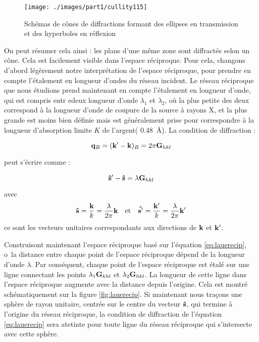 \begin{figure}
    \texttt{[image: ./images/part1/cullity115]}
    \caption{Schémas de cônes de diffractions formant des ellipses en transmission et des hyperboles en réflexion}
    \label{fig:laue}
\end{figure}

On peut résumer cela ainsi : les plans d'une même zone sont diffractés selon un cône. Cela est facilement visible dans l'espace réciproque. Pour cela, changons d'abord légèrement notre interprétation de l'espace réciproque, pour prendre en compte l'étalement en longueur d'ondes du réseau incident. Le réseau réciproque que nous étudions prend maintenant en compte l'étalement en longueur d'onde, qui est compris entr edeux longueur d'onde $\lambda_1$ et $\lambda_2$, où la plus petite des deux correspond à la longueur d'onde de coupure de la source à rayons X, et la plus grande est moins bien définie mais est généralement prise pour correspondre à la longueur d'absorption limite $K$ de l'argent( \SI{0.48}{\angstrom}).
La condition de diffraction :

\begin{equation}
    \mathbf{q}_B = (\mathbf{k'-k})_B = 2 \pi \mathbf{G}_{hkl}
\end{equation}

peut s'écrire comme :

\begin{equation}
    \label{eq:lauerecip}
    \mathbf{\hat{s}}' - \mathbf{\hat{s}} = \lambda \mathbf{G}_{hkl}
\end{equation}

avec
\begin{equation}
    \mathbf{\hat{s}} = \frac{\mathbf{k}}{k} = \frac{\lambda}{2\pi}\mathbf{k}\quad\text{et}\quad
    \mathbf{\hat{s'}} = \frac{\mathbf{k'}}{k} = \frac{\lambda}{2\pi}\mathbf{k'}
\end{equation}
ce sont les vecteurs unitaires correspondants aux directions de $\mathbf{k}$ et $\mathbf{k'}$.

Construisont maintenant l'espace réciproque basé sur l'équation \ref{eq:lauerecip}, o\ la distance entre chaque point de l'espace réciproque dépend de la longueur d'onde $\lambda$. Par conséquent, chaque point de l'espace réciproque est étalé sur une ligne connectant les points $\lambda_1\mathbf{G}_{khl}$ et $\lambda_2\mathbf{G}_{hkl}$. La longueur de cette ligne dans l'espace réciproque augmente avec la distance depuis l'origine. Cela est montré schématiquement sur la figure \ref{fig:lauerecip}. Si maintenant nous traçons une sphère de rayon unitaire, centrée sur le centre du vecteur $\mathbf{\hat{s}}$, qui termine à l'origine du réseau réciproque, la condition de diffraction de l'équation \ref{eq:lauerecip} sera atetinte pour toute ligne du réseau réciproque qui s'intersecte avec cette sphère.

